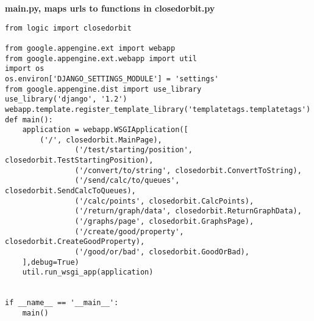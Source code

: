 \documentclass[11pt]{article}
\begin{document}
\begin{center}
\textbf{main.py, maps urls to functions in closedorbit.py}
\end{center}
\begin{verbatim}
from logic import closedorbit

from google.appengine.ext import webapp
from google.appengine.ext.webapp import util
import os
os.environ['DJANGO_SETTINGS_MODULE'] = 'settings'
from google.appengine.dist import use_library
use_library('django', '1.2')
webapp.template.register_template_library('templatetags.templatetags')
def main():
	application = webapp.WSGIApplication([
		('/', closedorbit.MainPage),
                ('/test/starting/position', closedorbit.TestStartingPosition),
                ('/convert/to/string', closedorbit.ConvertToString),
                ('/send/calc/to/queues', closedorbit.SendCalcToQueues),
                ('/calc/points', closedorbit.CalcPoints),
                ('/return/graph/data', closedorbit.ReturnGraphData),
                ('/graphs/page', closedorbit.GraphsPage),
                ('/create/good/property', closedorbit.CreateGoodProperty),
                ('/good/or/bad', closedorbit.GoodOrBad),
 	],debug=True)
	util.run_wsgi_app(application)


if __name__ == '__main__':
	main()
\end{verbatim}
\end{document}
